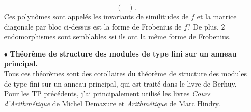\begin{itemize}
\[\begin{pmatrix}
\end{pmatrix}.\]
Ces polynômes sont appelés les invariants de similitudes de $f$ et la matrice diagonale par bloc ci-dessus est la forme de Frobenius de $f$? De plus, $2$ endomorphismes sont semblables ssi ils ont la même forme de Frobenius.
\item[$\bullet$] \textbf{Théorème de structure des modules de type fini sur un anneau principal.}\\ Tous ces théorèmes sont des corollaires du théorème de structure des modules de type fini sur un anneau principal, qui est traité dans le livre de Berhuy. Pour les TP précédents, j'ai principalement utilisé les livres \textit{Cours d'Arithmétique} de Michel Demazure et  \textit{Arithmétique} de Marc Hindry.
 
\end{itemize}
